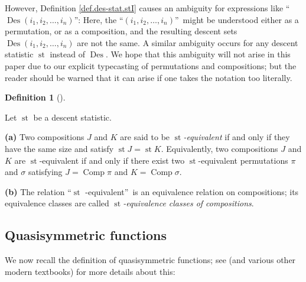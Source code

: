 \documentclass[numbers=enddot,12pt,final,onecolumn,notitlepage]{scrartcl}%
\theoremstyle{definition}
\newtheorem{defi}[theo]{Definition}
\newenvironment{definition}[1][]
{\begin{defi}[#1]\begin{leftbar}}
{\end{leftbar}\end{defi}}
\begin{document}
However, Definition \ref{def.des-stat.stI} causes an ambiguity for expressions
like \textquotedblleft$\operatorname*{Des}\left(  i_{1},i_{2},\ldots
,i_{n}\right)  $\textquotedblright: Here, the \textquotedblleft$\left(
i_{1},i_{2},\ldots,i_{n}\right)  $\textquotedblright\ might be understood
either as a permutation, or as a composition, and the resulting descent sets
$\operatorname*{Des}\left(  i_{1},i_{2},\ldots,i_{n}\right)  $ are not the
same. A similar ambiguity occurs for any descent statistic $\operatorname*{st}%
$ instead of $\operatorname*{Des}$. We hope that this ambiguity will not arise
in this paper due to our explicit typecasting of permutations and
compositions; but the reader should be warned that it can arise if one takes
the notation too literally.

\begin{definition}
\label{def.des-stat.eq-comp}Let $\operatorname*{st}$ be a descent statistic.

\textbf{(a)} Two compositions $J$ and $K$ are said to be $\operatorname*{st}%
$\textit{-equivalent} if and only if they have the same size and satisfy
$\operatorname*{st}J=\operatorname*{st}K$. Equivalently, two compositions $J$
and $K$ are $\operatorname*{st}$-equivalent if and only if there exist two
$\operatorname*{st}$-equivalent permutations $\pi$ and $\sigma$ satisfying
$J=\operatorname*{Comp}\pi$ and $K=\operatorname*{Comp}\sigma$.

\textbf{(b)} The relation \textquotedblleft$\operatorname*{st}$%
-equivalent\textquotedblright\ is an equivalence relation on compositions; its
equivalence classes are called $\operatorname*{st}$\textit{-equivalence
classes of compositions}.
\end{definition}

\subsection{Quasisymmetric functions}

We now recall the definition of quasisymmetric functions; see \cite[Chapter
5]{HopfComb} (and various other modern textbooks) for more details about this:
\end{document}
